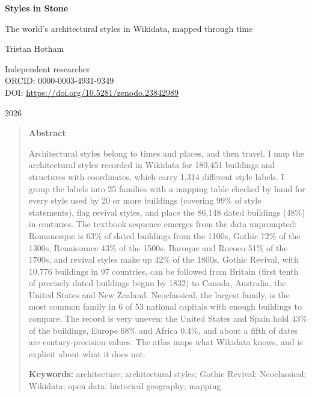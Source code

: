\documentclass[11pt,a4paper]{article}
\begin{document}
\begin{center}
{\Large\bfseries Styles in Stone\par}
\vspace{0.4em}
{\large The world's architectural styles in Wikidata, mapped through time\par}
\vspace{1.2em}
{\large Tristan Hotham\par}
\vspace{0.3em}
{\small Independent researcher\\
ORCID: 0000-0003-4931-9349\\
DOI: \href{https://doi.org/10.5281/zenodo.23842989}{https://doi.org/10.5281/zenodo.23842989}\par}
\vspace{0.8em}
2026
\end{center}

\begin{quote}
\small
\begin{center}\textbf{Abstract}\end{center}
Architectural styles belong to times and places, and then travel. I map the architectural styles recorded in Wikidata for 180,451 buildings and structures with coordinates, which carry 1,314 different style labels. I group the labels into 25 families with a mapping table checked by hand for every style used by 20 or more buildings (covering 99\% of style statements), flag revival styles, and place the 86,148 dated buildings (48\%) in centuries. The textbook sequence emerges from the data unprompted: Romanesque is 63\% of dated buildings from the 1100s, Gothic 72\% of the 1300s, Renaissance 43\% of the 1500s, Baroque and Rococo 51\% of the 1700s, and revival styles make up 42\% of the 1800s. Gothic Revival, with 10,776 buildings in 97 countries, can be followed from Britain (first tenth of precisely dated buildings begun by 1832) to Canada, Australia, the United States and New Zealand. Neoclassical, the largest family, is the most common family in 6 of 53 national capitals with enough buildings to compare. The record is very uneven: the United States and Spain hold 43\% of the buildings, Europe 68\% and Africa 0.4\%, and about a fifth of dates are century-precision values. The atlas maps what Wikidata knows, and is explicit about what it does not.

\textbf{Keywords:} architecture; architectural styles; Gothic Revival; Neoclassical; Wikidata; open data; historical geography; mapping
\end{quote}
\end{document}
